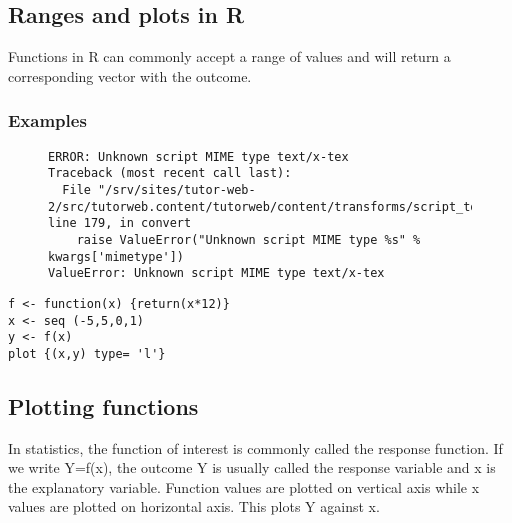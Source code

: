 \documentclass[12pt,a4paper]{article}
\theoremstyle{regla}
\theoremstyle{remark}
\theoremstyle{definition}
\theoremstyle{nonumberbreak}
\begin{document}
\subsection{Ranges and plots in R}
\begin{fbox}
\begin{minipage}{0.97\textwidth}
Functions in R can commonly accept a range of values and will return a corresponding vector with the outcome.


\end{minipage}
\end{fbox}
\subsubsection{Examples}
\begin{figure}[h]
\hspace{0.5mm}
\begin{minipage}{0.48\textwidth}
\begin{verbatim}ERROR: Unknown script MIME type text/x-tex
Traceback (most recent call last):
  File "/srv/sites/tutor-web-2/src/tutorweb.content/tutorweb/content/transforms/script_to_html.py", line 179, in convert
    raise ValueError("Unknown script MIME type %s" % kwargs['mimetype'])
ValueError: Unknown script MIME type text/x-tex
\end{verbatim}

\end{minipage}
\end{figure}
\begin{xmpl}
\begin{lstlisting}
f <- function(x) {return(x*12)}
x <- seq (-5,5,0,1)
y <- f(x)
plot {(x,y) type= 'l'} 
\end{lstlisting}
\end{xmpl}

\subsection{Plotting functions}
\begin{fbox}
\begin{minipage}{0.58\textwidth}
In statistics, the function of interest is commonly called the response function.
If we write Y=f(x),
the outcome Y is usually called the response variable and x is the explanatory variable.  Function values are plotted on vertical axis while x values are plotted on horizontal axis. This plots Y against x.

\end{minipage}
\hspace{0.5mm}
\begin{minipage}{0.38\textwidth}


\end{minipage}
\end{fbox}
\end{document}

